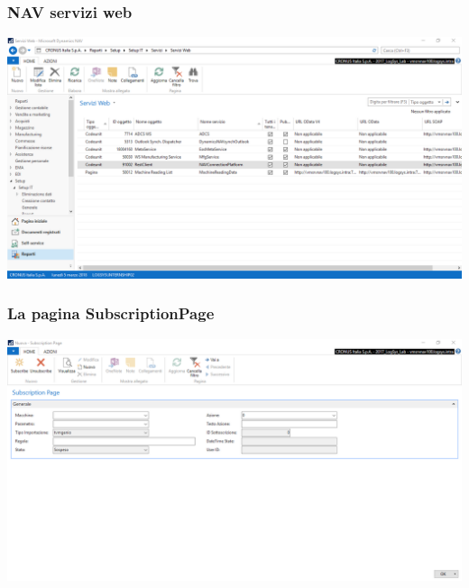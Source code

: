 \documentclass{beamer}
\begin{document}



\begin{frame}
\frametitle{NAV servizi web}
\includegraphics[width=1\textwidth]{images/NAVServiziWeb.png}
\end{frame}


\begin{frame}
\frametitle{La pagina SubscriptionPage}
\includegraphics[width=1\textwidth]{images/NAVSubscriptionPage.png}
\end{frame}
\end{document}
